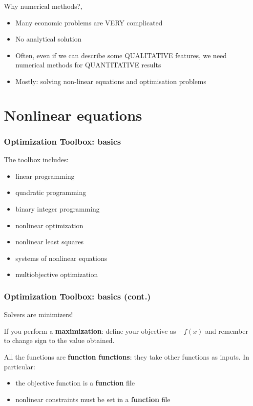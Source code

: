 \documentclass[show notes]{beamer}%
\begin{document}
{\begin{frame}[fragile]{Why numerical methods?},
\begin{itemize}[<+->]
\item Many economic problems are VERY complicated
\item No analytical solution
\item Often, even if we can describe some QUALITATIVE features, we need numerical methods for QUANTITATIVE results
\item Mostly: solving non-linear equations and optimisation problems
\end{itemize}
\end{frame}

\section{Nonlinear equations}


\begin{frame}[fragile]
\frametitle{Optimization Toolbox: basics}
The toolbox includes:
\begin{itemize}[<+->]
\item linear programming
\item quadratic programming
\item binary integer programming
\item nonlinear optimization
\item nonlinear least squares
\item systems of nonlinear equations
\item multiobjective optimization
\end{itemize}

\end{frame}


\begin{frame}[fragile]
\frametitle{Optimization Toolbox: basics (cont.)}
Solvers are minimizers!\pause

If you perform a \textbf{maximization}: define your objective as $-f(x)$ and remember to change sign to the value obtained.\pause

All the functions are \textbf{function functions}: they take other functions as inputs. In particular:
\begin{itemize}
\item the objective function is a \textbf{function} file
\item nonlinear constraints must be set in a \textbf{function} file
\end{itemize}\pause


\end{frame}}
\end{document}
